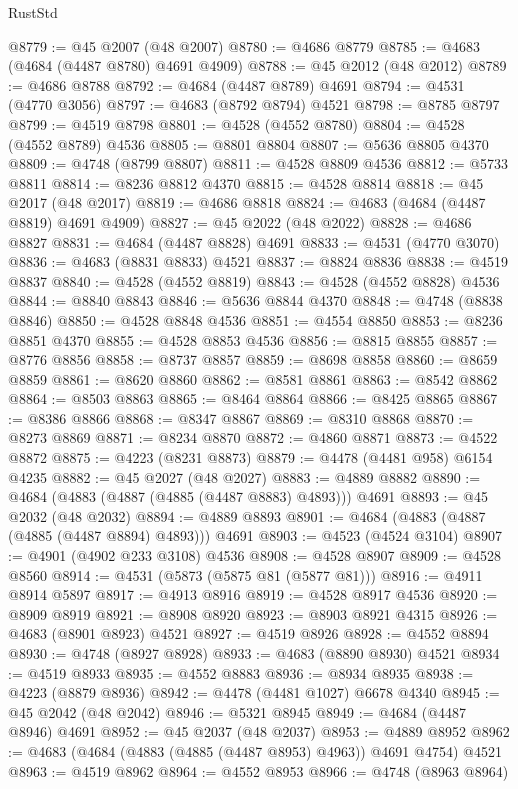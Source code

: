 \begin{lexlean}{RustStd}
\begin{coremodule}
@8779 := @45 @2007 (@48 @2007)
@8780 := @4686 @8779
@8785 := @4683 (@4684 (@4487 @8780) @4691 @4909)
@8788 := @45 @2012 (@48 @2012)
@8789 := @4686 @8788
@8792 := @4684 (@4487 @8789) @4691
@8794 := @4531 (@4770 @3056)
@8797 := @4683 (@8792 @8794) @4521
@8798 := @8785 @8797
@8799 := @4519 @8798
@8801 := @4528 (@4552 @8780)
@8804 := @4528 (@4552 @8789) @4536
@8805 := @8801 @8804
@8807 := @5636 @8805 @4370
@8809 := @4748 (@8799 @8807)
@8811 := @4528 @8809 @4536
@8812 := @5733 @8811
@8814 := @8236 @8812 @4370
@8815 := @4528 @8814
@8818 := @45 @2017 (@48 @2017)
@8819 := @4686 @8818
@8824 := @4683 (@4684 (@4487 @8819) @4691 @4909)
@8827 := @45 @2022 (@48 @2022)
@8828 := @4686 @8827
@8831 := @4684 (@4487 @8828) @4691
@8833 := @4531 (@4770 @3070)
@8836 := @4683 (@8831 @8833) @4521
@8837 := @8824 @8836
@8838 := @4519 @8837
@8840 := @4528 (@4552 @8819)
@8843 := @4528 (@4552 @8828) @4536
@8844 := @8840 @8843
@8846 := @5636 @8844 @4370
@8848 := @4748 (@8838 @8846)
@8850 := @4528 @8848 @4536
@8851 := @4554 @8850
@8853 := @8236 @8851 @4370
@8855 := @4528 @8853 @4536
@8856 := @8815 @8855
@8857 := @8776 @8856
@8858 := @8737 @8857
@8859 := @8698 @8858
@8860 := @8659 @8859
@8861 := @8620 @8860
@8862 := @8581 @8861
@8863 := @8542 @8862
@8864 := @8503 @8863
@8865 := @8464 @8864
@8866 := @8425 @8865
@8867 := @8386 @8866
@8868 := @8347 @8867
@8869 := @8310 @8868
@8870 := @8273 @8869
@8871 := @8234 @8870
@8872 := @4860 @8871
@8873 := @4522 @8872
@8875 := @4223 (@8231 @8873)
@8879 := @4478 (@4481 @958) @6154 @4235
@8882 := @45 @2027 (@48 @2027)
@8883 := @4889 @8882
@8890 := @4684 (@4883 (@4887 (@4885 (@4487 @8883) @4893))) @4691
@8893 := @45 @2032 (@48 @2032)
@8894 := @4889 @8893
@8901 := @4684 (@4883 (@4887 (@4885 (@4487 @8894) @4893))) @4691
@8903 := @4523 (@4524 @3104)
@8907 := @4901 (@4902 @233 @3108) @4536
@8908 := @4528 @8907
@8909 := @4528 @8560
@8914 := @4531 (@5873 (@5875 @81 (@5877 @81)))
@8916 := @4911 @8914 @5897
@8917 := @4913 @8916
@8919 := @4528 @8917 @4536
@8920 := @8909 @8919
@8921 := @8908 @8920
@8923 := @8903 @8921 @4315
@8926 := @4683 (@8901 @8923) @4521
@8927 := @4519 @8926
@8928 := @4552 @8894
@8930 := @4748 (@8927 @8928)
@8933 := @4683 (@8890 @8930) @4521
@8934 := @4519 @8933
@8935 := @4552 @8883
@8936 := @8934 @8935
@8938 := @4223 (@8879 @8936)
@8942 := @4478 (@4481 @1027) @6678 @4340
@8945 := @45 @2042 (@48 @2042)
@8946 := @5321 @8945
@8949 := @4684 (@4487 @8946) @4691
@8952 := @45 @2037 (@48 @2037)
@8953 := @4889 @8952
@8962 := @4683 (@4684 (@4883 (@4885 (@4487 @8953) @4963)) @4691 @4754) @4521
@8963 := @4519 @8962
@8964 := @4552 @8953
@8966 := @4748 (@8963 @8964)

\end{coremodule}
\end{lexlean}
